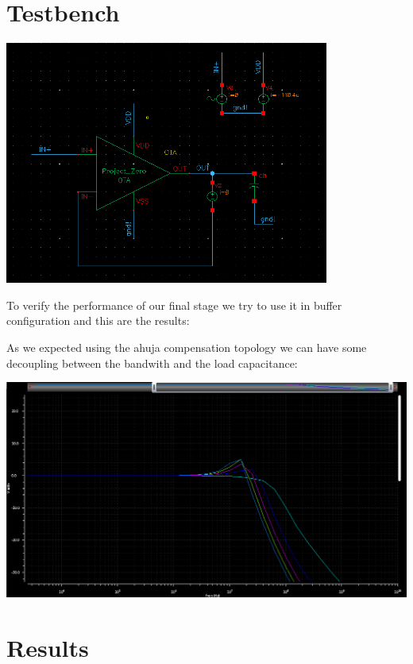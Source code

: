 \section{Testbench}

\centering
\includegraphics[width=0.8\textwidth]{Capitoli/tb.png}
\raggedright



To verify the performance of our final stage we try to use it in buffer configuration and this are the results:

As we expected using the ahuja compensation topology we can have some decoupling between the bandwith and the load capacitance:


\centering
\includegraphics[width=1\textwidth]{Capitoli/cap.png}
\raggedright

\newpage

\section{Results}

